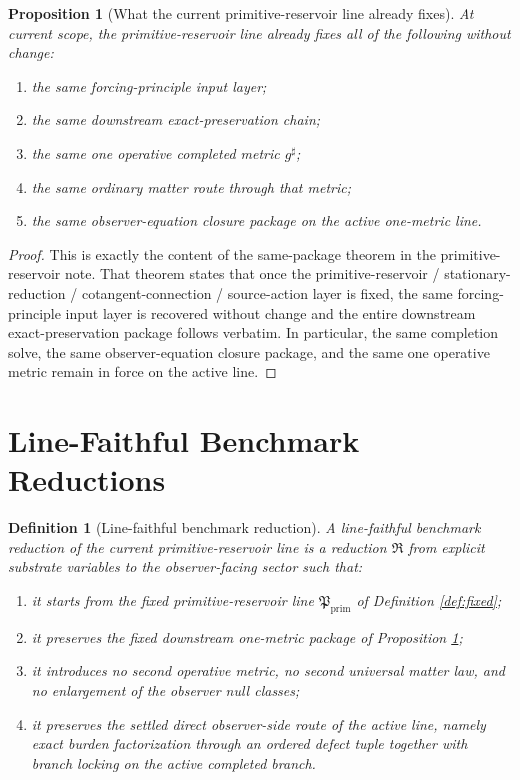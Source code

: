 \documentclass[11pt]{article}
\newcommand{\CompletedMetric}{g^{\sharp}}
\newcommand{\PrimitiveLine}{\mathfrak P_{\mathrm{prim}}}
\newcommand{\Reduction}{\mathfrak R}
\newtheorem{definition}{Definition}
\newtheorem{proposition}{Proposition}
\begin{document}
\begin{proposition}[What the current primitive-reservoir line already fixes]
\label{prop:fixedpackage}
At current scope, the primitive-reservoir line already fixes all of the following without change:
\begin{enumerate}
    \item the same forcing-principle input layer;
    \item the same downstream exact-preservation chain;
    \item the same one operative completed metric \(\CompletedMetric\);
    \item the same ordinary matter route through that metric;
    \item the same observer-equation closure package on the active one-metric line.
\end{enumerate}
\end{proposition}

\begin{proof}
This is exactly the content of the same-package theorem in the primitive-reservoir note. That theorem states that once the primitive-reservoir / stationary-reduction / cotangent-connection / source-action layer is fixed, the same forcing-principle input layer is recovered without change and the entire downstream exact-preservation package follows verbatim. In particular, the same completion solve, the same observer-equation closure package, and the same one operative metric remain in force on the active line.
\end{proof}

\section{Line-Faithful Benchmark Reductions}

\begin{definition}[Line-faithful benchmark reduction]
\label{def:reduction}
A \emph{line-faithful benchmark reduction} of the current primitive-reservoir line is a reduction \(\Reduction\) from explicit substrate variables to the observer-facing sector such that:
\begin{enumerate}
    \item it starts from the fixed primitive-reservoir line \(\PrimitiveLine\) of Definition \ref{def:fixed};
    \item it preserves the fixed downstream one-metric package of Proposition \ref{prop:fixedpackage};
    \item it introduces no second operative metric, no second universal matter law, and no enlargement of the observer null classes;
    \item it preserves the settled direct observer-side route of the active line, namely exact burden factorization through an ordered defect tuple together with branch locking on the active completed branch.
\end{enumerate}
\end{definition}
\end{document}

